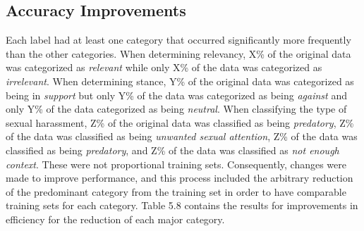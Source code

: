 \subsection{Accuracy Improvements}

Each label had at least one category that occurred significantly more frequently than the other categories. When determining relevancy, X\% of the original data was categorized as \textit{relevant} while only X\% of the data was categorized as \textit{irrelevant}. When determining stance, Y\% of the original data was categorized as being in \textit{support} but only Y\% of the data was categorized as being \textit{against} and only Y\% of the data  categorized as being \textit{neutral}. When classifying the type of sexual harassment, Z\% of the original data was classified as being \textit{predatory}, Z\% of the data was classified as being \textit{unwanted sexual attention}, Z\% of the data was classified as being \textit{predatory}, and Z\% of the data was classified as \textit{not enough context}. These were not proportional training sets. Consequently, changes were made to improve performance, and this process included the arbitrary reduction of the predominant category from the training set in order to have comparable training sets for each category. Table 5.8 contains the results for improvements in efficiency for the reduction of each major category.

